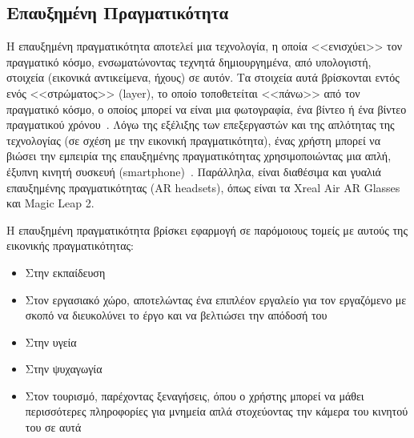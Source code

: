 \subsection{Επαυξημένη Πραγματικότητα}\label{subsec:augmentedReality}
Η επαυξημένη πραγματικότητα αποτελεί μια τεχνολογία, η οποία <<ενισχύει>> τον πραγματικό κόσμο, ενσωματώνοντας τεχνητά δημιουργημένα, από υπολογιστή, στοιχεία (εικονικά αντικείμενα, ήχους) σε αυτόν. Τα στοιχεία αυτά βρίσκονται εντός ενός <<στρώματος>> (layer), το οποίο τοποθετείται <<πάνω>> από τον πραγματικό κόσμο, ο οποίος μπορεί να είναι μια φωτογραφία, ένα βίντεο ή ένα βίντεο πραγματικού χρόνου~\cite{hosch_2020_augmented}\cite{carmigniani_2011_augmented}. Λόγω της εξέλιξης των επεξεργαστών και της απλότητας της τεχνολογίας (σε σχέση με την εικονική πραγματικότητα), ένας χρήστη μπορεί να βιώσει την εμπειρία της επαυξημένης πραγματικότητας χρησιμοποιώντας μια απλή, έξυπνη κινητή συσκευή (smartphone)~\cite{ko_2013_usability}. Παράλληλα, είναι διαθέσιμα και γυαλιά επαυξημένης πραγματικότητας (AR headsets), όπως είναι τα Xreal Air AR Glasses και Magic Leap 2.

Η επαυξημένη πραγματικότητα βρίσκει εφαρμογή σε παρόμοιους τομείς με αυτούς της εικονικής πραγματικότητας:
\begin{itemize}
    \item Στην εκπαίδευση~\cite{wu_2013_current}\cite{lee_2012_augmented}
    \item Στον εργασιακό χώρο, αποτελώντας ένα επιπλέον εργαλείο για τον εργαζόμενο με σκοπό να διευκολύνει το έργο και να βελτιώσει την απόδοσή του~\cite{kim_2016_augmented}\cite{funk_2017_working}\cite{pereira_2023_augmented}
    \item Στην υγεία~\cite{klinker_2019_digital}\cite{zhu_2015_design}\cite{gerup_2020_augmented}\cite{solbiati_2020_augmented}
    \item Στην ψυχαγωγία~\cite{hung_2021_a}
    \item Στον τουρισμό, παρέχοντας ξεναγήσεις, όπου ο χρήστης μπορεί να μάθει περισσότερες πληροφορίες για μνημεία απλά στοχεύοντας την κάμερα του κινητού του σε αυτά~\cite{yovcheva_2012_smartphone}\cite{kounavis_2012_enhancing}
\end{itemize} 

